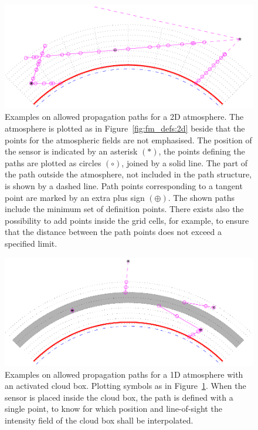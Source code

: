 \begin{figure}[p]
 \begin{center}
  \includegraphics*[width=0.99\hsize]{ppath_cases2}
  \caption{Examples on allowed propagation paths for a 2D atmosphere. 
    The atmosphere is plotted as in Figure~\ref{fig:fm_defs:2d} beside
    that the points for the atmospheric fields are not emphasised.
    The position of the sensor is indicated by an asterisk $(\ast)$,
    the points defining the paths are plotted as circles $(\circ)$,
    joined by a solid line. The part of the path outside the
    atmosphere, not included in the path structure, is shown by a
    dashed line. Path points corresponding to a tangent point are
    marked by an extra plus sign $(\oplus)$. The shown paths include
    the minimum set of definition points. There exists also the
    possibility to add points inside the grid cells, for example, to
    ensure that the distance between the path points does not exceed
    a specified limit.}
  \label{fig:fm_defs:ppath_cases2}
 \end{center}
\end{figure}

\begin{figure}[p]
 \begin{center}
  \includegraphics*[width=0.99\hsize]{ppath_cases1}
  \caption{Examples on allowed propagation paths for a 1D atmosphere
    with an activated cloud box. Plotting symbols as in
    Figure~\ref{fig:fm_defs:ppath_cases2}. When the sensor is placed 
    inside the cloud box, the path is defined with a single point, 
    to know for which position and line-of-sight the intensity field of
    the cloud box shall be interpolated. }
  \label{fig:fm_defs:ppath_cases1}
 \end{center}
\end{figure}

